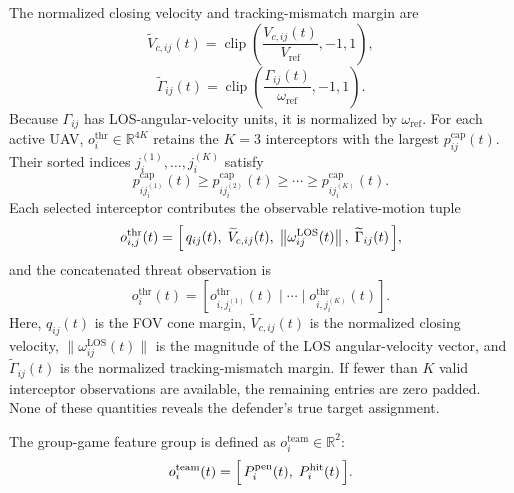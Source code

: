 \documentclass{cja}
\begin{document}
The normalized closing velocity and tracking-mismatch margin are
\begin{equation}
\widetilde V_{c,ij}(t)
=
\operatorname{clip}\!\left(
\frac{V_{c,ij}(t)}{V_{\mathrm{ref}}},
-1,1
\right),
\end{equation}
\begin{equation}
\widetilde\Gamma_{ij}(t)
=
\operatorname{clip}\!\left(
\frac{\Gamma_{ij}(t)}{\omega_{\mathrm{ref}}},
-1,1
\right).
\end{equation}
Because $\Gamma_{ij}$ has LOS-angular-velocity units, it is normalized by $\omega_{\mathrm{ref}}$. For each active UAV, $o_i^{\mathrm{thr}}\in\mathbb{R}^{4K}$ retains the $K=3$ interceptors with the largest $p_{ij}^{\mathrm{cap}}(t)$. Their sorted indices $j_i^{(1)},\ldots,j_i^{(K)}$ satisfy
\begin{equation}
p_{i j_i^{(1)}}^{\mathrm{cap}}(t)
\ge p_{i j_i^{(2)}}^{\mathrm{cap}}(t)
\ge\cdots\ge
p_{i j_i^{(K)}}^{\mathrm{cap}}(t).
\end{equation}
Each selected interceptor contributes the observable relative-motion tuple
\begin{equation}
o_{i,j}^{\mathrm{thr}}(t)=
\Bigl[\,
q_{ij}(t),\;
\widetilde V_{c,ij}(t),\;
\left\|\omega_{ij}^{\mathrm{LOS}}(t)\right\|,\;
\widetilde\Gamma_{ij}(t)
\,\Bigr],
\label{eq:obs-thr}
\end{equation}
and the concatenated threat observation is
\begin{equation}
o_i^{\mathrm{thr}}(t)
=
\left[
o_{i,j_i^{(1)}}^{\mathrm{thr}}(t)
\mid\cdots\mid
o_{i,j_i^{(K)}}^{\mathrm{thr}}(t)
\right].
\end{equation}
Here, $q_{ij}(t)$ is the FOV cone margin, $\widetilde V_{c,ij}(t)$ is the normalized closing velocity, $\|\omega_{ij}^{\mathrm{LOS}}(t)\|$ is the magnitude of the LOS angular-velocity vector, and $\widetilde\Gamma_{ij}(t)$ is the normalized tracking-mismatch margin. If fewer than $K$ valid interceptor observations are available, the remaining entries are zero padded. None of these quantities reveals the defender's true target assignment.

The group-game feature group is defined as $o_i^{\mathrm{team}}\in\mathbb{R}^{2}$:
\begin{equation}
o_i^{\mathrm{team}}(t)=\Bigl[\,P_i^{\mathrm{pen}}(t),\;P_i^{\mathrm{hit}}(t)\,\Bigr].
\label{eq:obs-team}
\end{equation}
\end{document}
